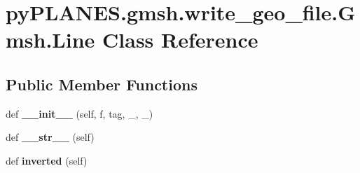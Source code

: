 \hypertarget{classpy_p_l_a_n_e_s_1_1gmsh_1_1write__geo__file_1_1_gmsh_1_1_line}{}\section{py\+P\+L\+A\+N\+E\+S.\+gmsh.\+write\+\_\+geo\+\_\+file.\+Gmsh.\+Line Class Reference}
\label{classpy_p_l_a_n_e_s_1_1gmsh_1_1write__geo__file_1_1_gmsh_1_1_line}
\subsection*{Public Member Functions}
\begin{DoxyCompactItemize}
\item 
\mbox{\label{classpy_p_l_a_n_e_s_1_1gmsh_1_1write__geo__file_1_1_gmsh_1_1_line_aa874eb1a6a65ad823e32122bb19c5f1f}} 
def {\bfseries \+\_\+\+\_\+init\+\_\+\+\_\+} (self, f, tag, \+\_, \+\_)
\item 
\mbox{\label{classpy_p_l_a_n_e_s_1_1gmsh_1_1write__geo__file_1_1_gmsh_1_1_line_af48c6f47351a12d11cc1a2c98bd307fc}} 
def {\bfseries \+\_\+\+\_\+str\+\_\+\+\_\+} (self)
\item 
\mbox{\label{classpy_p_l_a_n_e_s_1_1gmsh_1_1write__geo__file_1_1_gmsh_1_1_line_a920dfb84ec2527f1850d80ca2b7d3eab}} 
def {\bfseries inverted} (self)
\end{DoxyCompactItemize}
